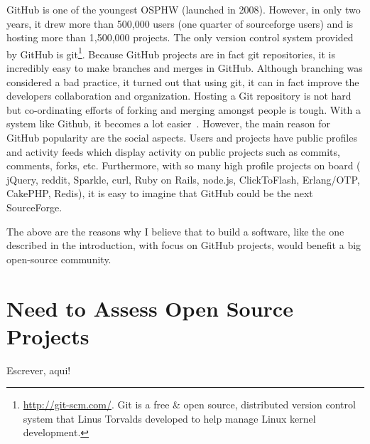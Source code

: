 GitHub is one of the youngest OSPHW (launched in 2008). 
However, in only two years, it drew more than 500,000 users (one quarter of sourceforge users) and is hosting more than 1,500,000 projects. 
The only version control system provided by GitHub is 
git\footnote{\url{http://git-scm.com/}. 
  Git is a free \& open source, distributed version control system that Linus Torvalds developed to help manage Linux kernel development.
}.
Because GitHub projects are in fact git repositories, 
it is incredibly easy to make branches and merges in GitHub. 
Although branching was considered a bad practice, 
it turned out that using git, it can in fact improve the developers collaboration and organization.
Hosting a Git repository is not hard but co-ordinating efforts of forking and merging amongst people is tough. 
With a system like Github, it becomes a lot easier~\cite{petercooper2010}.
However, the main reason for GitHub popularity are the social aspects.
Users and projects have public profiles and activity feeds which display activity on public projects such as commits, comments, forks, etc.
Furthermore, with so many high profile projects on board (
jQuery, 
reddit, 
Sparkle, 
curl, 
Ruby on Rails, 
node.js, 
ClickToFlash, 
Erlang/OTP, 
CakePHP, 
Redis), 
it is easy to imagine that GitHub could be the next SourceForge.

The above are the reasons why I believe that to build a software, like the one described in the introduction, with focus on GitHub projects, would benefit a big open-source community. 

\section{Need to Assess Open Source Projects}

Escrever, aqui!

